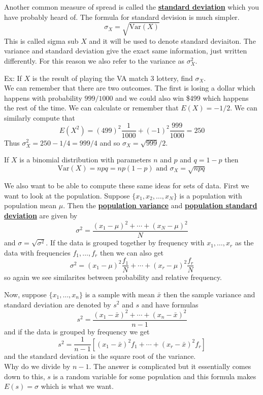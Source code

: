 \documentclass[14,fleqn]{article}
\newcommand{\defn}[1]{\textbf{\underline{#1}}}
\newcommand{\var}{\ensuremath{\mathrm{Var}}}
\begin{document}
Another common measure of spread is called the \defn{standard deviation} which you have probably heard of. The formula for standard devision is much simpler.
\[
	\sigma_X=\sqrt{\var(X)}
\]
This is called sigma sub $X$ and it will be used to denote standard deviaiton. The variance and standard deviation give the exact same information, just written differently. For this reason we also refer to the variance as $\sigma_X^2.$

Ex: If $X$ is the result of playing the VA match 3 lottery, find $\sigma_X.$\\
We can remember that there are two outcomes. The first is losing a dollar which happens with probability $999/1000$ and we could also win \$499 which happens the rest of the time. We can calculate or remember that $E(X)=-1/2.$ We can similarly compute that
\[
	E(X^2)=(499)^2\frac{1}{1000}+(-1)^2\frac{999}{1000}=250
\]
Thus $\sigma_X^2=250-1/4=999/4$ and so $\sigma_X=\sqrt{999}/2.$

If $X$ is a binomial distribution with parameters $n$ and $p$ and $q=1-p$ then
\[
	\var(X)=npq=np(1-p)\text{ and }\sigma_X=\sqrt{npq}
\]

We also want to be able to compute these same ideas for sets of data. First we want to look at the population.
Suppose $\{x_1,x_2,\dots,x_N\}$ is a population with population mean $\mu.$ Then the \defn{population variance} and \defn{population standard deviation} are given by
\[
	\sigma^2=\frac{(x_1-\mu)^2+\cdots+(x_N-\mu)^2}{N}
\]
and $\sigma=\sqrt{\sigma^2}.$ If the data is grouped together by frequency with $x_1,\dots,x_r$ as the data with frequencies $f_1,\dots,f_r$ then we can also get
\[
	\sigma^2=(x_1-\mu)^2\frac{f_1}{N}+\cdots+(x_r-\mu)^2\frac{f_r}{N}
\]
so again we see similarites between probability and relative frequency.

Now, suppose $\{x_1,\dots,x_n\}$ is a sample with mean $\bar{x}$ then the sample variance and standard deviation are denoted by $s^2$ and $s$ and have formulas
\[
	s^2=\frac{(x_1-\bar{x})^2+\cdots +(x_n-\bar{x})^2}{n-1}
\]
and if the data is grouped by frequency we get
\[
	s^2=\frac{1}{n-1}\left[(x_1-\bar{x})^2f_1+\cdots+(x_r-\bar{x})^2f_r\right]
\]
and the standard deviation is the square root of the variance.\\

Why do we divide by $n-1.$ The answer is complicated but it essentially comes down to this, $s$ is a random variable for some population and this formula makes $E(s)=\sigma$ which is what we want.\\
\end{document}
